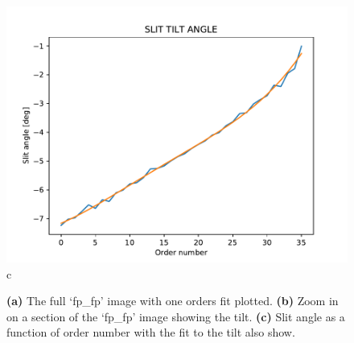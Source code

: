 \begin{figure}
\begin{center}
\begin{minipage}{.495\textwidth}
\begin{center}
\includegraphics[width=\textwidth]{Figures/cal_SLIT_spirou_2.pdf}
c
\end{center}
\end{minipage}%
\end{center}

\caption{\textbf{(a)} The full `fp\_fp' image with one orders fit plotted. \textbf{(b)} Zoom in on a section of the `fp\_fp' image showing the tilt. \textbf{(c)} Slit angle as a function of order number with the fit to the tilt also show. \label{figure:cal_SLIT_spirou}}
\end{figure}